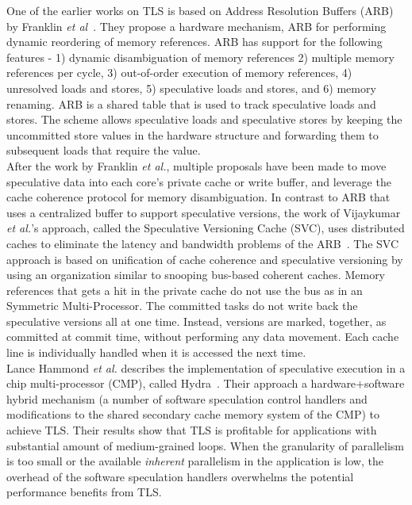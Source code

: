 \documentclass[10pt]{report}          %
\begin{document}
One of the earlier works on TLS is based on Address Resolution Buffers (ARB) by Franklin \textit{et al}~\cite{ARB}.  They propose a hardware mechanism, ARB for performing dynamic reordering of memory references.  ARB has support for the following features - 1) dynamic disambiguation of memory references 2) multiple memory
references per cycle, 3) out-of-order execution of memory references, 4) unresolved loads and stores, 5) speculative loads and stores, and 6) memory renaming. ARB is a shared table that is used to track speculative loads and stores.  The scheme allows speculative loads and speculative stores by keeping the uncommitted store values in the hardware structure and forwarding them to subsequent loads that require the value.\\
After the work by Franklin \textit{et al.}, multiple proposals have been made to move speculative data into each core’s private cache or write buffer, and leverage the cache coherence protocol for memory disambiguation.   In contrast to ARB that uses a centralized buffer to support speculative versions, the work of Vijaykumar \textit{et al.}'s approach, called the Speculative Versioning Cache (SVC), uses distributed caches to eliminate the latency and bandwidth problems of the ARB~\cite{Gopal}. The SVC approach is based on unification of cache coherence and speculative versioning by using an organization similar to snooping bus-based coherent caches. Memory references that gets a hit in the private cache do not use the bus as in an Symmetric Multi-Processor. The committed tasks do not write back the speculative versions all at one time. Instead, versions are marked, together, as committed at commit time, without performing any data movement. Each cache line is individually handled when it is accessed the next time.\\
Lance Hammond \textit{et al.} describes the implementation of speculative execution in a chip multi-processor (CMP), called Hydra~\cite{Hydra}. Their approach a hardware+software hybrid mechanism (a number of software speculation control handlers and modifications to the shared secondary cache memory system of the CMP) to achieve TLS. Their results show that TLS is profitable for applications with substantial amount of medium-grained loops.  When the granularity of parallelism is too small or the available \textit{inherent} parallelism in the application is low, the overhead of the software speculation handlers overwhelms the potential performance benefits from TLS.\\
\end{document}
